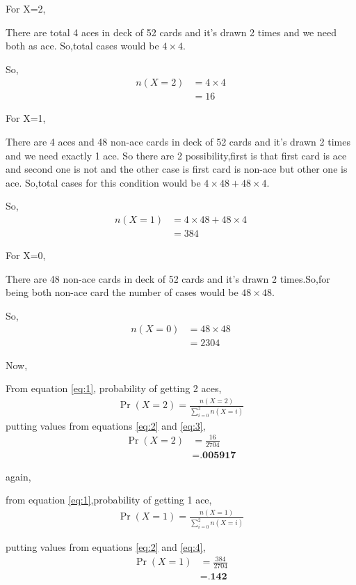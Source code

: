\documentclass{beamer}
\providecommand{\brak}[1]{\ensuremath{\left(#1\right)}}
\begin{document}
\begin{frame}
For X=2,

There are total 4 aces in deck of 52 cards and it's drawn 2 times and we need both as ace. So,total cases would be $4\times4$.

So,
\begin{align}
\label{eq:3}
n\brak{X = 2}&=4\times4     \nonumber  \\
&=16
\end{align}
\end{frame}
\begin{frame}
For X=1,

There are 4 aces and 48 non-ace cards in deck of 52 cards and it's drawn 2 times and we need exactly 1 ace. So there are 2 possibility,first is that first card is ace and second one is not and the other case is first card is non-ace but other one is ace. So,total cases for this condition would be $4\times48+48\times4$.

So,
\begin{align}
\label{eq:4}
n\brak{X = 1}&=4\times48+48\times4        \nonumber \\
&=384
\end{align}
\end{frame}
\begin{frame}
For X=0,

There are 48 non-ace cards in deck of 52 cards and it's drawn 2 times.So,for being both non-ace card the number of cases would be $48\times48$. 

So,
\begin{align}
\label{eq:5}
n\brak{X = 0}&=48\times48              \nonumber\\
&=2304
\end{align}
\end{frame}
\begin{frame}
Now,

From equation \eqref{eq:1}, probability of getting 2 aces,
\begin{align}
\Pr\brak{X = 2} = \frac{n\brak{X = 2}}{\sum_{i=0}^2 n\brak{X = i}}
\end{align}
putting values from equations \eqref{eq:2} and \eqref{eq:3},
\begin{align}
\Pr\brak{X = 2}&=\frac{16}{2704}  \\
&=\textbf{.005917}
\end{align}
\end{frame}
\begin{frame}
again,

from equation \eqref{eq:1},probability of getting 1 ace,
\begin{align}
\Pr\brak{X = 1} = \frac{n\brak{X = 1}}{\sum_{i=0}^2 n\brak{X = i}}
\end{align}

putting values from equations \eqref{eq:2} and \eqref{eq:4},
\begin{align}
\Pr\brak{X = 1}&=\frac{384}{2704}  \\
&=\textbf{.142}
\end{align}
\end{frame}
\end{document}
